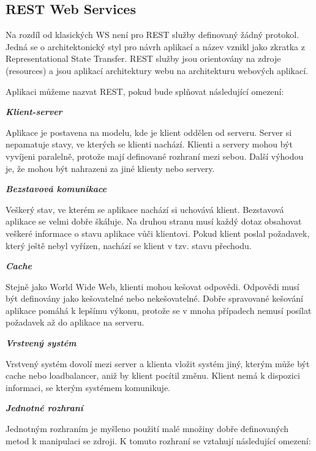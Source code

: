 \documentclass[11pt,twoside,a4paper]{book}
\begin{document}
\subsection{REST Web Services}

Na rozdíl od klasických WS není pro REST služby definovaný žádný protokol. Jedná
se o architektonický styl pro návrh aplikací a název vznikl jako zkratka z  Representational State Transfer. REST služby jsou orientovány na zdroje (resources) a jsou aplikací architektury webu na architekturu webových aplikací. 

Aplikaci můžeme nazvat REST, pokud bude splňovat následující omezení:

\textbf{\textit{Klient-server}}

Aplikace je postavena na modelu, kde je klient oddělen od serveru. Server si nepamatuje
stavy, ve kterých se klienti nachází. Klienti a servery mohou být vyvíjeni paralelně, protože
mají definované rozhraní mezi sebou. Další výhodou je, že mohou být nahrazeni za jiné
klienty nebo servery.

\textbf{\textit{Bezstavová komunikace}}

Veškerý stav, ve kterém se aplikace nachází si uchovává klient. Bezstavová aplikace se velmi
dobře škáluje. Na druhou stranu musí každý dotaz obsahovat veškeré informace o stavu
aplikace vůči klientovi. Pokud klient poslal požadavek, který ještě nebyl vyřízen, nachází se
klient v tzv. stavu přechodu.

\textbf{\textit{Cache}}

Stejně jako World Wide Web, klienti mohou kešovat odpovědi. Odpovědi musí být
definovány jako kešovatelné nebo nekešovatelné. Dobře spravované kešování aplikace
pomáhá k lepšímu výkonu, protože se v mnoha případech nemusí posílat požadavek až do
aplikace na serveru.

\textbf{\textit{Vrstvený systém}}

Vrstvený systém dovolí mezi server a klienta vložit systém jiný, kterým může být cache nebo
loadbalancer, aniž by klient pocítil změnu. Klient nemá k dispozici informaci, se kterým
systémem komunikuje.

\textbf{\textit{Jednotné rozhraní}}

Jednotným rozhraním je myšleno použití malé množiny dobře definovaných metod k
manipulaci se zdroji. K tomuto rozhraní se vztahují následující omezení:
\end{document}
